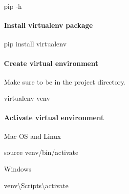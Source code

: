 \documentclass[
]{article}
\newenvironment{Shaded}{}{}
\newcommand{\BuiltInTok}[1]{#1}
\newcommand{\ExtensionTok}[1]{#1}
\newcommand{\NormalTok}[1]{#1}
\begin{document}
\begin{Shaded}
\begin{Highlighting}[]
\ExtensionTok{pip}\NormalTok{ {-}h}
\end{Highlighting}
\end{Shaded}

\hypertarget{install-virtualenv-package}{%
\paragraph{Install virtualenv
package}\label{install-virtualenv-package}}

\begin{Shaded}
\begin{Highlighting}[]
\ExtensionTok{pip}\NormalTok{ install virtualenv}
\end{Highlighting}
\end{Shaded}

\hypertarget{create-virtual-environment}{%
\paragraph{Create virtual
environment}\label{create-virtual-environment}}

Make sure to be in the project directory.

\begin{Shaded}
\begin{Highlighting}[]
\ExtensionTok{virtualenv}\NormalTok{ venv}
\end{Highlighting}
\end{Shaded}

\hypertarget{activate-virtual-environment}{%
\paragraph{Activate virtual
environment}\label{activate-virtual-environment}}

Mac OS and Linux

\begin{Shaded}
\begin{Highlighting}[]
\BuiltInTok{source}\NormalTok{ venv/bin/activate}
\end{Highlighting}
\end{Shaded}

Windows

\begin{Shaded}
\begin{Highlighting}[]
\ExtensionTok{venv}\NormalTok{\textbackslash{}Scripts\textbackslash{}activate}
\end{Highlighting}
\end{Shaded}
\end{document}

